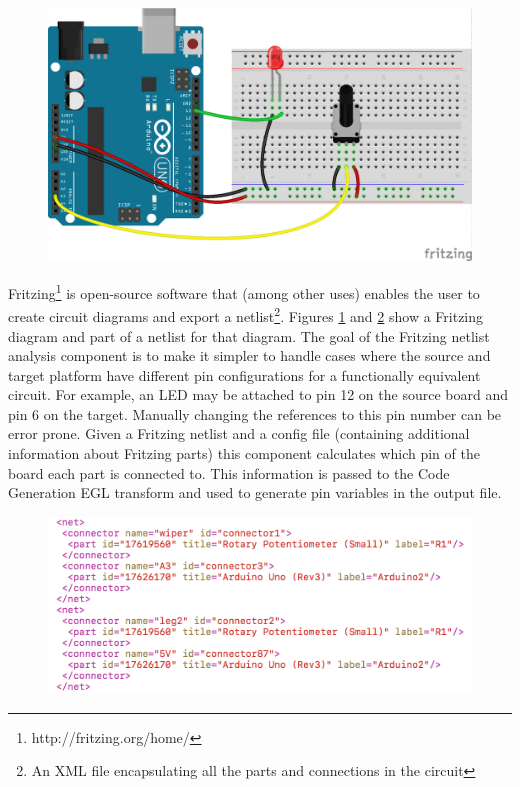 \documentclass{UoYCSproject}
\begin{document}
\begin{figure}[h!]
  \centering
  \includegraphics[width=0.6\linewidth]{graphics/fritzing_graphic.png}
  \label{fig:fritz_graph}
\end{figure}

Fritzing\footnote{http://fritzing.org/home/} is open-source software that (among other uses) enables the user to create circuit diagrams and export a netlist\footnote{An XML file encapsulating all the parts and connections in the circuit}. Figures \ref{fig:fritz_graph} and \ref{fig:fritz_net} show a Fritzing diagram and part of a netlist for that diagram. The goal of the Fritzing netlist analysis component is to make it simpler to handle cases where the source and target platform have different pin configurations for a functionally equivalent circuit. For example, an LED may be attached to pin 12 on the source board and pin 6 on the target. Manually changing the references to this pin number can be error prone. Given a Fritzing netlist and a config file (containing additional information about Fritzing parts) this component calculates which pin of the board each part is connected to. This information is passed to the Code Generation EGL transform and used to generate pin variables in the output file.

\begin{figure}[h!]
  \centering
  \includegraphics[width=0.8\linewidth]{graphics/fritzing_netlist.png}
  \label{fig:fritz_net}
\end{figure}
\end{document}

